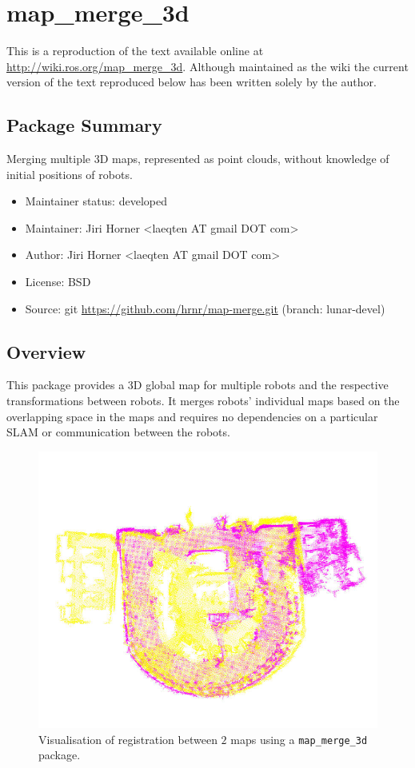 \chapter{map\_merge\_3d}
\label{chap:map_merge-wiki}

This is a reproduction of the text available online at \url{http://wiki.ros.org/map_merge_3d}. Although maintained as the wiki the current version of the text reproduced below has been written solely by the author.

\section{Package Summary}

Merging multiple \gls{3D} maps, represented as point clouds, without knowledge of initial positions of robots.

\begin{itemize}
    \item Maintainer status: developed
    \item Maintainer: Jiri Horner \textless laeqten AT gmail DOT com\textgreater
    \item Author: Jiri Horner \textless laeqten AT gmail DOT com\textgreater
    \item License: BSD
    \item Source: git \url{https://github.com/hrnr/map-merge.git} (branch: lunar-devel)
\end{itemize}


\section{Overview}

This package provides a \gls{3D} global map for multiple robots and the respective transformations between robots. It merges robots' individual maps based on the overlapping space in the maps and requires no dependencies on a particular \gls{SLAM} or communication between the robots.

\begin{figure}
    \centering
    \includegraphics[width=4.53in]{../img/screenshot.jpg}
    \caption[The merged map for $2$ robots.]{Visualisation of registration between $2$ maps using a \texttt{map\_merge\_3d} package.}
    \label{fig:mapmergescreenshot}
\end{figure}

